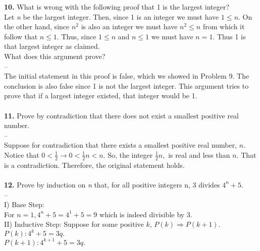 \documentclass[paper=letter, fontsize=11pt]{scrartcl} %
\begin{document}
\textbf{10.} What is wrong with the following proof that 1 is the largest integer? \\

Let \textit{n} be the largest integer. Then, since 1 is an integer we must have $1 \le n$. On the other hand, since $n^2$ is also an integer we must have $n^2 \le n$ from which it follow that $n \le 1$. Thus, since $1 \le n$ and $n \le 1$ we must have $n = 1$. Thus 1 is that largest integer as claimed.
\\

What does this argument prove?
\\
--\\
The initial statement in this proof is false, which we showed in Problem 9. The conclusion is also false since 1 is not the largest integer. This argument tries to prove that if a largest integer existed, that integer would be 1.\\
\\

\textbf{11.} Prove by contradiction that there does not exist a smallest positive real number.
\\
--\\
Suppose for contradiction that there exists a smallest positive real number, $n$. Notice that $ 0 < \frac{1}{2} \rightarrow 0 < \frac{1}{2}n < n.$ So, the integer $\frac{1}{2}n,$ is real and less than $n$. That is a contradiction. Therefore, the original statement holds.\\
\\

\textbf{12.} Prove by induction on \textit{n} that, for all positive integers n, 3 divides $4^n + 5$.
\\
--\\
I) Base Step:\\
For $n = 1, 4^n + 5 = 4^1 + 5 = 9$ which is indeed divisible by 3. \\

II) Inductive Step: Suppose for some positive $k$, $P(k) \Rightarrow P(k+1)$.\\
$P(k): 4^k + 5 = 3q.$\\
$P(k+1): 4^{k+1} + 5 = 3q.$\\
\end{document}
